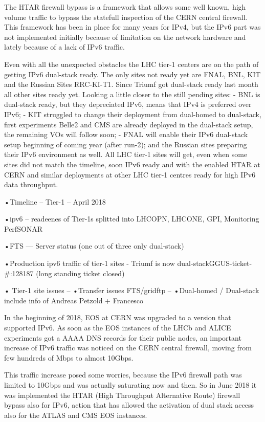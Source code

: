 The HTAR firewall bypass is a framework that allows some well known, high volume traffic to bypass the statefull inspection of the CERN central firewall. This framework has been in place for many years for IPv4, but the IPv6 part was not implemented initially because of limitation on the network hardware and lately because of a lack of IPv6 traffic.  

Even with all the unexpected obstacles the LHC tier-1 centers are on the path of getting IPv6 dual-stack ready. The only sites not ready yet are FNAL, BNL, KIT and the Russian Sites RRC-KI-T1. Since Triumf got dual-stack ready last month all other sites ready yet. Looking a little closer to the still pending sites: 
-	BNL is dual-stack ready, but they depreciated IPv6, means that IPv4 is preferred over IPv6;
-	KIT struggled to change their deployment from dual-homed to dual-stack, first experiments Belle2 and CMS are already deployed in the dual-stack setup, the remaining VOs will follow soon; 
-	FNAL will enable their IPv6 dual-stack setup beginning of coming year (after run-2); and the Russian sites preparing their IPv6 environment as well.
All LHC tier-1 sites will get, even when some sites did not match the timeline, soon IPv6 ready and with the enabled HTAR at CERN and similar deployments at other LHC tier-1 centres ready for high IPv6 data throughput.


•Timeline  -- Tier-1 – April 2018

•ipv6      -- readeenes of Tier-1s splitted into LHCOPN, LHCONE, GPI, Monitoring PerfSONAR

•FTS       --- Server status (one out of three only dual-stack)

•Production ipv6 traffic of tier-1 sites
- Triumf is now dual-stackGGUS-ticket-\#:128187 (long standing ticket closed)

• Tier-1 site issues
--  •Transfer issues FTS/gridftp
--  •Dual-homed / Dual-stack  include info of Andreas Petzold + Francesco

In the beginning of 2018, EOS at CERN was upgraded to a version that supported IPv6. 
As soon as the EOS instances of the LHCb and ALICE experiments got a AAAA DNS records for their public nodes, an important increase of IPv6 traffic was noticed on the CERN central firewall, moving from few hundreds of Mbps to almost 10Gbps.

This traffic increase posed some worries, because the IPv6 firewall path was limited to 10Gbps and was actually saturating now and then. So in June 2018 it was implemented the HTAR (High Throughput Alternative Route) firewall bypass also for IPv6, action that has allowed the activation of dual stack access also for the ATLAS and CMS EOS instances. 

